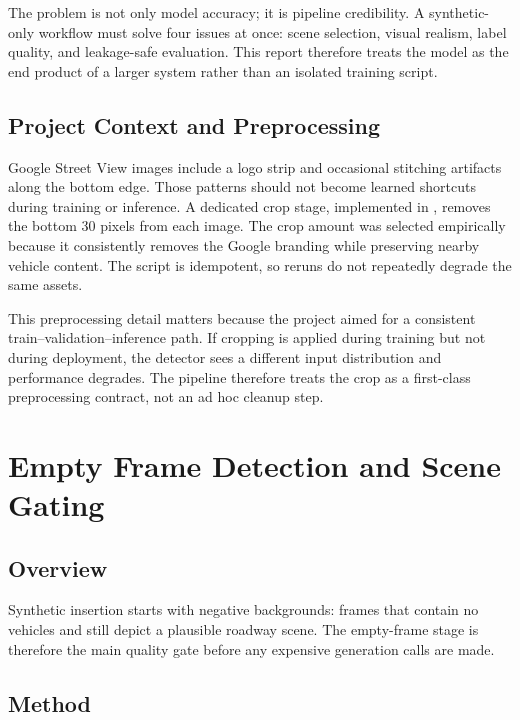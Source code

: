 \documentclass[12pt,a4paper]{article}
\newcommand{\fpath}[1]{\texttt{\detokenize{#1}}}
\begin{document}
The problem is not only model accuracy; it is pipeline credibility. A synthetic-only workflow must solve four issues at once: scene selection, visual realism, label quality, and leakage-safe evaluation. This report therefore treats the model as the end product of a larger system rather than an isolated training script.

\subsection{Project Context and Preprocessing}

Google Street View images include a logo strip and occasional stitching artifacts along the bottom edge. Those patterns should not become learned shortcuts during training or inference. A dedicated crop stage, implemented in \fpath{scripts/02b_crop_bottom.py}, removes the bottom 30 pixels from each image. The crop amount was selected empirically because it consistently removes the Google branding while preserving nearby vehicle content. The script is idempotent, so reruns do not repeatedly degrade the same assets.

This preprocessing detail matters because the project aimed for a consistent train--validation--inference path. If cropping is applied during training but not during deployment, the detector sees a different input distribution and performance degrades. The pipeline therefore treats the crop as a first-class preprocessing contract, not an ad hoc cleanup step.

\section{Empty Frame Detection and Scene Gating}

\subsection{Overview}

Synthetic insertion starts with negative backgrounds: frames that contain no vehicles and still depict a plausible roadway scene. The empty-frame stage is therefore the main quality gate before any expensive generation calls are made.

\subsection{Method}
\end{document}
